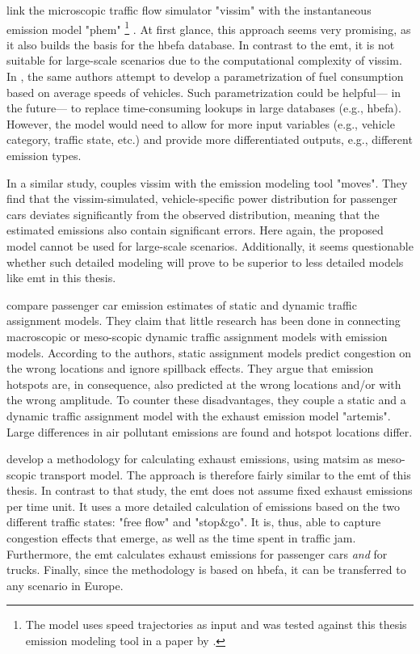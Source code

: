 \citet{HirschmannEtAl_ITSC_2010} link the microscopic traffic flow simulator "\gls{vissim}" with the instantaneous 
emission model "\gls{phem}"%
%
\footnote{
%
The model uses speed trajectories as input and was tested against this thesis emission 
modeling tool in a paper by 
\citet{HuelsmannEtAl_LAS_2011}.
%
}%
. At first glance, this approach seems very promising, as it also builds the 
basis for the \gls{hbefa} database. In contrast to the \gls{emt}, it is not 
suitable for large-scale scenarios due to the computational complexity of 
\gls{vissim}.
%
In \citet{Kraschl-HirschmannEtAl_FISTS_2011}, the same authors attempt to 
develop a parametrization of fuel consumption based on average speeds of 
vehicles. Such parametrization could be helpful--- in the future--- to replace 
time-consuming lookups in large databases (e.g., \gls{hbefa}). However, the 
model would need to allow for more input variables (e.g., vehicle category, 
traffic state, etc.) and provide more differentiated outputs, e.g., 
different emission types.

In a similar study, \citet{SongEtAl_TRR_2012} couples \gls{vissim} with the emission modeling tool "\gls{moves}". They find 
that the \gls{vissim}-simulated, vehicle-specific power distribution for 
passenger cars deviates significantly from the observed distribution, meaning that  the estimated emissions also contain significant errors. Here 
again, the proposed model cannot be used for large-scale scenarios. Additionally, it seems questionable whether such detailed 
modeling will prove to be superior to less detailed models like \gls{emt} in 
this thesis.

\citet{WismansEtAl_TRB_2013} compare passenger car emission 
estimates of static and dynamic traffic assignment models. They claim that 
little research has been done in connecting macroscopic or meso-scopic dynamic 
traffic assignment models with emission models.
%
According to the authors, static assignment models predict congestion on the 
wrong locations and ignore spillback effects. They argue that emission 
hotspots are, in consequence, also predicted at the wrong locations and/or 
with the wrong amplitude.
%
To counter these disadvantages, they couple a static and a dynamic traffic assignment model with 
the exhaust emission model "\gls{artemis}". Large differences in air 
pollutant emissions are found and hotspot locations differ.

\citet{HatzopoulouMiller_TransResD_2010} develop a methodology for 
calculating exhaust emissions, using \gls{matsim} as meso-scopic transport 
model. The approach is therefore fairly similar to the \gls{emt} of this thesis.
%
In contrast to that study, the \gls{emt} does not assume fixed exhaust 
emissions per time unit. It uses a more detailed calculation of emissions based 
on the two different traffic states: "free flow" and "stop\&go". It is, thus, 
able to capture congestion effects that emerge, as well as the time spent 
in traffic jam. 
Furthermore, the \gls{emt} calculates exhaust emissions for passenger cars 
\emph{and} for trucks. Finally, since the methodology is based on \gls{hbefa}, 
it can be transferred to any scenario in Europe.

